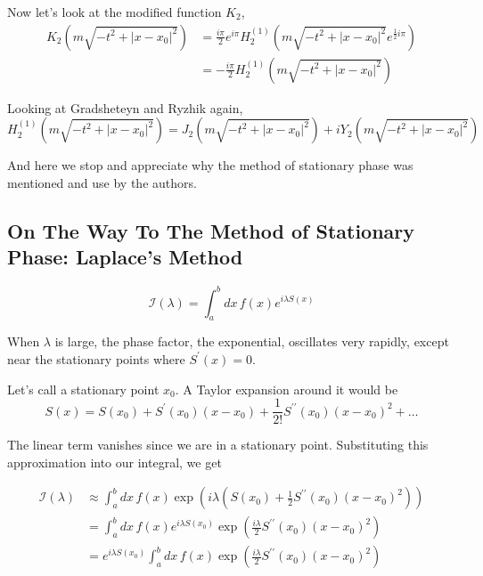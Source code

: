 Now let's look at the modified function $K_2$,
\begin{align*}
K_2\left(m \sqrt{ -t^2 + |x-x_0|^2}\right) &=
    \frac{i\pi}{2} e^{i\pi} H_{2}^{(1)} \left(m \sqrt{ -t^2 + |x-x_0|^2} e^{\frac{1}{2} i\pi} \right) \\
    &= - \frac{i\pi}{2} H_{2}^{(1)} \left(m \sqrt{ -t^2 + |x-x_0|^2} \right)
\end{align*}

Looking at Gradsheteyn and Ryzhik again,
$$
H_{2}^{(1)} \left(m \sqrt{ -t^2 + |x-x_0|^2} \right) =
    J_2 \left(m \sqrt{ -t^2 + |x-x_0|^2} \right) + i Y_2 \left(m \sqrt{ -t^2 + |x-x_0|^2} \right)
$$

And here we stop and appreciate why the method of stationary phase was mentioned and use by the authors.






\subsection{On The Way To The Method of Stationary Phase: Laplace's Method}


$$
\mathcal{I}(\lambda) = \int_{a}^{b} dx \, f(x) e^{i\lambda S(x)}
$$

When $\lambda$ is large, the phase factor, the exponential, oscillates very rapidly,
except near the stationary points where $S^{\prime} (x) = 0$.

Let's call a stationary point $x_0$.
A Taylor expansion around it would be
$$
S(x) =
    S(x_0) + S^{\prime} (x_0) (x - x_0) + \frac{1}{2!} S^{\prime \prime} (x_0) (x - x_0)^2 + \dots
$$

The linear term vanishes since we are in a stationary point.
Substituting this approximation into our integral, we get

\begin{align*}
\mathcal{I}(\lambda) &\approx
    \int_{a}^{b} dx \, f(x) \exp \left( i\lambda \left(
        S(x_0) + \frac{1}{2} S^{\prime \prime} (x_0) (x - x_0)^2
    \right) \right) \\
&= \int_{a}^{b} dx \, f(x)
    e^{ i\lambda S(x_0) }
    \exp \left( \frac{i \lambda}{2} S^{\prime \prime} (x_0) (x - x_0)^2 \right) \\
&= e^{ i\lambda S(x_0) } \int_{a}^{b} dx \, f(x)
    \exp \left( \frac{i \lambda}{2} S^{\prime \prime} (x_0) (x - x_0)^2 \right)
\end{align*}


